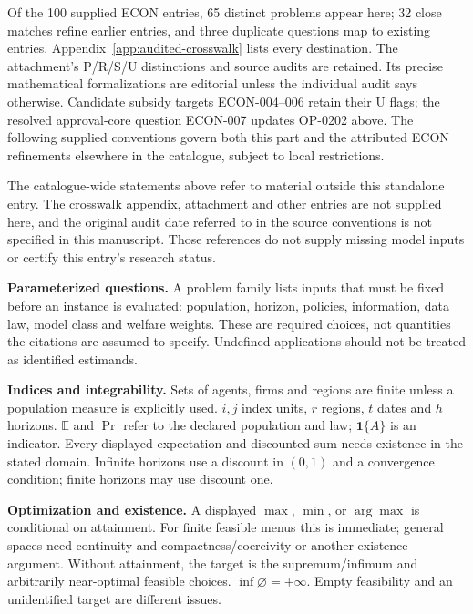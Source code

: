\documentclass[11pt,a4paper]{article}
\begin{document}
\label{audited:conventions}

Of the 100 supplied ECON entries, 65 distinct problems appear here; 32 close
matches refine earlier entries, and three duplicate questions map to existing
entries. Appendix~\ref{app:audited-crosswalk} lists every destination.
The attachment's P/R/S/U distinctions and source audits are retained. Its
precise mathematical formalizations are editorial unless the individual audit
says otherwise. Candidate subsidy targets ECON-004--006 retain their U flags;
the resolved approval-core question ECON-007 updates OP-0202 above.
The following supplied conventions govern both this part and the attributed
ECON refinements elsewhere in the catalogue, subject to local restrictions.

The catalogue-wide statements above refer to material outside this standalone entry. The crosswalk appendix, attachment and other entries are not supplied here, and the original audit date referred to in the source conventions is not specified in this manuscript. Those references do not supply missing model inputs or certify this entry's research status.

\textbf{Parameterized questions.} A problem family lists inputs that must be fixed before an instance is evaluated: population, horizon, policies, information, data law, model class and welfare weights. These are required choices, not quantities the citations are assumed to specify. Undefined applications should not be treated as identified estimands.

\textbf{Indices and integrability.} Sets of agents, firms and regions are finite unless a population measure is explicitly used. \(i,j\) index units, \(r\) regions, \(t\) dates and \(h\) horizons. \(\mathbb E\) and \(\Pr\) refer to the declared population and law; \(\mathbf1\{A\}\) is an indicator. Every displayed expectation and discounted sum needs existence in the stated domain. Infinite horizons use a discount in \((0,1)\) and a convergence condition; finite horizons may use discount one.

\textbf{Optimization and existence.} A displayed \(\max\), \(\min\), or \(\arg\max\) is conditional on attainment. For finite feasible menus this is immediate; general spaces need continuity and compactness/coercivity or another existence argument. Without attainment, the target is the supremum/infimum and arbitrarily near-optimal feasible choices. \(\inf\varnothing=+\infty\). Empty feasibility and an unidentified target are different issues.
\end{document}

